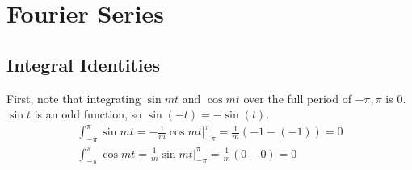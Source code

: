 \section{Fourier Series}

\subsection{Integral Identities}

First, note that integrating $\sin mt$ and $\cos mt$ over the full period of $-\pi,\pi$ is 0.
$\sin t$ is an odd function, so $\sin(-t)=-\sin(t)$.
\begin{align*}
    \int_{-\pi}^\pi \sin mt = -\frac{1}{m} \cos mt\Bigg|_{-\pi}^\pi  = \frac{1}{m}(-1 - (-1))= 0\\
    \int_{-\pi}^\pi \cos mt = \frac{1}{m} \sin mt \Bigg|_{-\pi}^\pi = \frac{1}{m}(0 - 0) = 0
\end{align*}

